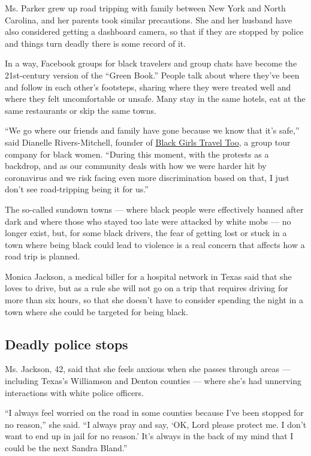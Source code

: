 Ms. Parker grew up road tripping with family between New York and North
Carolina, and her parents took similar precautions. She and her husband
have also considered getting a dashboard camera, so that if they are
stopped by police and things turn deadly there is some record of it.

In a way, Facebook groups for black travelers and group chats have
become the 21st-century version of the ``Green Book.'' People talk about
where they've been and follow in each other's footsteps, sharing where
they were treated well and where they felt uncomfortable or unsafe. Many
stay in the same hotels, eat at the same restaurants or skip the same
towns.

``We go where our friends and family have gone because we know that it's
safe,'' said Dianelle Rivers-Mitchell, founder of
\href{https://www.blackgirlstraveltoo.com/}{Black Girls Travel Too}, a
group tour company for black women. ``During this moment, with the
protests as a backdrop, and as our community deals with how we were
harder hit by coronavirus and we risk facing even more discrimination
based on that, I just don't see road-tripping being it for us.''

The so-called sundown towns --- where black people were effectively
banned after dark and where those who stayed too late were attacked by
white mobs --- no longer exist, but, for some black drivers, the fear of
getting lost or stuck in a town where being black could lead to violence
is a real concern that affects how a road trip is planned.

Monica Jackson, a medical biller for a hospital network in Texas said
that she loves to drive, but as a rule she will not go on a trip that
requires driving for more than six hours, so that she doesn't have to
consider spending the night in a town where she could be targeted for
being black.

\hypertarget{deadly-police-stops}{%
\subsection{Deadly police stops}\label{deadly-police-stops}}

Ms. Jackson, 42, said that she feels anxious when she passes through
areas --- including Texas's Williamson and Denton counties --- where
she's had unnerving interactions with white police officers.

``I always feel worried on the road in some counties because I've been
stopped for no reason,'' she said. ``I always pray and say, `OK, Lord
please protect me. I don't want to end up in jail for no reason.' It's
always in the back of my mind that I could be the next Sandra Bland.''

